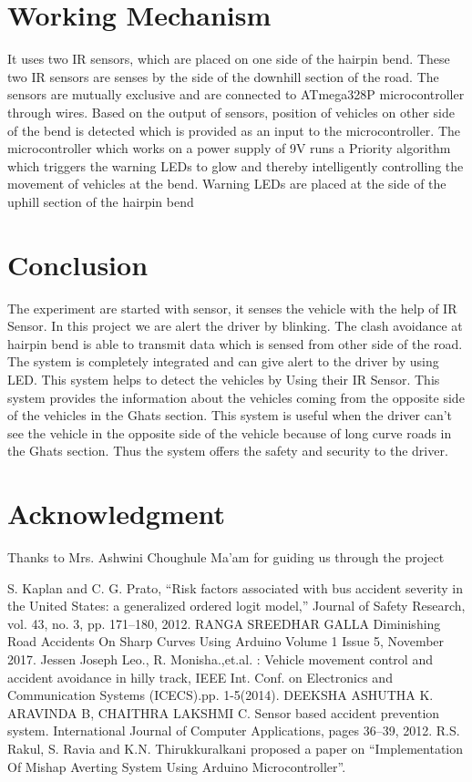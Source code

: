 \documentclass[conference]{IEEEtran}
\begin{document}
    \section{Working Mechanism}
    It uses two IR sensors, which are
    placed on one side of the hairpin bend. These two IR sensors
    are senses by the side of the downhill section of the road.
    The sensors are mutually exclusive and are connected to
    ATmega328P microcontroller through wires. Based on the
    output of sensors, position of vehicles on other side of the
    bend is detected which is provided as an input to the
    microcontroller. The microcontroller which works on a
    power supply of 9V runs a Priority algorithm which triggers
    the warning LEDs to glow and thereby intelligently
    controlling the movement of vehicles at the bend. Warning
    LEDs are placed at the side of the uphill section of the
    hairpin bend

    \section{Conclusion}
    The experiment are started with sensor, it senses the vehicle
    with the help of IR Sensor. In this project we are alert the
    driver by blinking. The clash avoidance at hairpin bend is
    able to transmit data which is sensed from other side of the
    road. The system is completely integrated and can give alert
    to the driver by using LED. This system helps to detect the
    vehicles by Using their IR Sensor. This system provides the
    information about the vehicles coming from the opposite side of the vehicles in the Ghats section. This system is useful
    when the driver can't see the vehicle in the opposite side of
    the vehicle because of long curve roads in the Ghats section.
    Thus the system offers the safety and security to the driver.
    \section*{Acknowledgment}

    Thanks to Mrs. Ashwini Choughule Ma'am for guiding us through the project


    \begin{thebibliography}{00}
         S. Kaplan and C. G. Prato, “Risk factors associated with bus accident severity in the United States: a generalized ordered logit model,” Journal of Safety
        Research, vol. 43, no. 3, pp. 171–180, 2012.
         RANGA SREEDHAR GALLA Diminishing Road Accidents On Sharp Curves Using Arduino Volume 1 Issue 5, November 2017.
         Jessen Joseph Leo., R. Monisha.,et.al. : Vehicle movement control and accident avoidance in hilly track, IEEE Int. Conf. on Electronics and Communication
        Systems (ICECS).pp. 1-5(2014).
         DEEKSHA ASHUTHA K. ARAVINDA B, CHAITHRA LAKSHMI C. Sensor based accident prevention system. International Journal of Computer
        Applications, pages 36–39, 2012.
         R.S. Rakul, S. Ravia and K.N. Thirukkuralkani proposed a paper on “Implementation Of
        Mishap Averting System Using Arduino Microcontroller”.
        \end{thebibliography}
\end{document}
